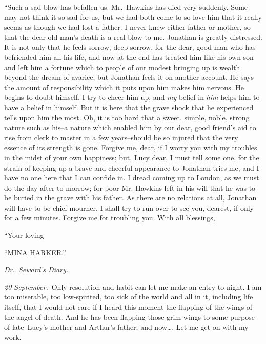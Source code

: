 \documentclass[12pt,openright]{book}
\begin{document}
“Such a sad blow has befallen us. Mr. Hawkins has died very suddenly. Some may not think it so sad for us, but we had both come to so love him that it really seems as though we had lost a father. I never knew either father or mother, so that the dear old man’s death is a real blow to me. Jonathan is greatly distressed. It is not only that he feels sorrow, deep sorrow, for the dear, good man who has befriended him all his life, and now at the end has treated him like his own son and left him a fortune which to people of our modest bringing up is wealth beyond the dream of avarice, but Jonathan feels it on another account. He says the amount of responsibility which it puts upon him makes him nervous. He begins to doubt himself. I try to cheer him up, and \textit{my} belief in \textit{him} helps him to have a belief in himself. But it is here that the grave shock that he experienced tells upon him the most. Oh, it is too hard that a sweet, simple, noble, strong nature such as his–a nature which enabled him by our dear, good friend’s aid to rise from clerk to master in a few years–should be so injured that the very essence of its strength is gone. Forgive me, dear, if I worry you with my troubles in the midst of your own happiness; but, Lucy dear, I must tell some one, for the strain of keeping up a brave and cheerful appearance to Jonathan tries me, and I have no one here that I can confide in. I dread coming up to London, as we must do the day after to-morrow; for poor Mr. Hawkins left in his will that he was to be buried in the grave with his father. As there are no relations at all, Jonathan will have to be chief mourner. I shall try to run over to see you, dearest, if only for a few minutes. Forgive me for troubling you. With all blessings,

“Your loving

“MINA HARKER.”

\textit{Dr. Seward’s Diary.}

\textit{20 September.}–Only resolution and habit can let me make an entry to-night. I am too miserable, too low-spirited, too sick of the world and all in it, including life itself, that I would not care if I heard this moment the flapping of the wings of the angel of death. And he has been flapping those grim wings to some purpose of late–Lucy’s mother and Arthur’s father, and now…. Let me get on with my work.
\end{document}
